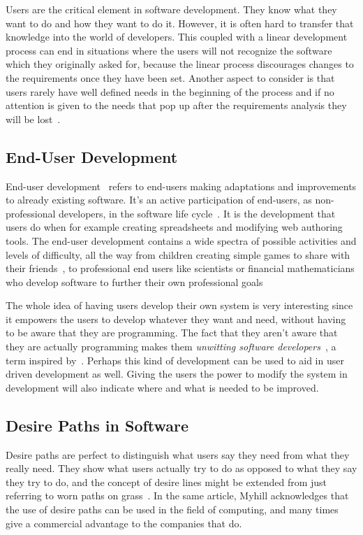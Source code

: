 \documentclass[a4paper]{report}
\begin{document}
Users are the critical element in software development. They know what they want to do and how they want to do it. However, it is often hard to transfer that knowledge into the world of developers. This coupled with a linear development process can end in situations where the users will not recognize the software which they originally asked for, because the linear process discourages changes to the requirements once they have been set. Another aspect to consider is that users rarely have well defined needs in the beginning of the process and if no attention is given to the needs that pop up after the requirements analysis they will be lost~\cite{Mrenak:1990}.

\subsection{End-User Development}
End-user development~\cite{Lieberman-et-al:2006} refers to end-users making adaptations and improvements to already existing software. It's an active participation of end-users, as non-professional developers, in the software life cycle~\cite{Farmer-Gruba:2006}. It is the development that users do when for example creating spreadsheets and modifying web authoring tools. The end-user development contains a wide spectra of possible activities and levels of difficulty, all the way from children creating simple games to share with their friends~\cite{Petre-Blackwell:2007}, to professional end users like scientists or financial mathematicians who develop software to further their own professional goals~\cite{Segal:2007}

The whole idea of having users develop their own system is very interesting since it empowers the users to develop whatever they want and need, without having to be aware that they are programming. The fact that they aren't aware that they are actually programming makes them \emph{unwitting software developers}~\cite{Costabile-et-al:2008}, a term inspired by~\cite{Petre-Blackwell:2007}. Perhaps this kind of development can be used to aid in user driven development as well. Giving the users the power to modify the system in development will also indicate where and what is needed to be improved.

\subsection{Desire Paths in Software} \label{sec:desire-paths-in-software}
Desire paths are perfect to distinguish what users say they need from what they really need. They show what users actually try to do as opposed to what they say they try to do, and the concept of desire lines might be extended from just referring to worn paths on grass~\cite{Myhill:2004}. In the same article, Myhill acknowledges that the use of desire paths can be used in the field of computing, and many times give a commercial advantage to the companies that do.
\end{document}
